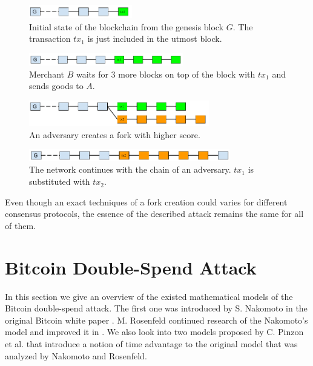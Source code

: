 \documentclass[10pt,a4paper]{article}
\numberwithin{equation}{section} %
\theoremstyle{plain}
\theoremstyle{definition}
\theoremstyle{remark}
\begin{document}
    \begin{figure}[h]
            \centering
            \includegraphics[width=0.4\textwidth]{Fig1}
            \caption{Initial state of the blockchain from the genesis block \(G\). The transaction \(tx_1\) is just included in the utmost block.}
            \label{fig:Fig1}
    \end{figure}
    \begin{figure}[h]
            \centering
            \includegraphics[width=0.6\textwidth]{Fig2}
            \caption{Merchant \(B\) waits for 3 more blocks on top of the block with \(tx_1\) and sends goods to \(A\).}
            \label{fig:Fig2}
    \end{figure}
    \begin{figure}[h]
            \centering
            \includegraphics[width=0.7\textwidth]{Fig3}
            \caption{An adversary creates a fork with higher score.}
            \label{fig:Fig3}
    \end{figure}
    \begin{figure}[h]
            \centering
            \includegraphics[width=0.78\textwidth]{Fig4}
            \caption{The network continues with the chain of an adversary. \(tx_1\) is substituted with \(tx_2\).}
            \label{fig:Fig4}
    \end{figure}
    
    Even though an exact techniques of a fork creation could varies for different consensus protocols, the essence of the described attack remains the same for all of them. 
	
	\section{Bitcoin Double-Spend Attack} \label{sec:bitcoin_models}
	
	In this section we give an overview of the existed mathematical models of the Bitcoin double-spend attack. The first one was introduced by S. Nakomoto in the original Bitcoin white paper \cite{N08}. M. Rosenfeld continued research of the Nakomoto's model and improved it in \cite{R14}. We also look into two models proposed by C. Pinzon et al. \cite{PR16} that introduce a notion of time advantage to the original model that was analyzed by Nakomoto and Rosenfeld.
	
\end{document}
